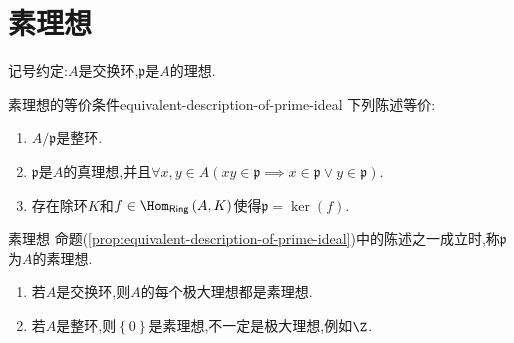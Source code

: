 \section{素理想}

记号约定:$A$是交换环,$\mathfrak{p}$是$A$的理想.

\begin{proposition}{素理想的等价条件}{equivalent-description-of-prime-ideal}
	下列陈述等价:
	\begin{enumerate}
		\item $A/\mathfrak{p}$是整环.
		\item $\mathfrak{p}$是$A$的真理想,并且$\forall x,y\in A\left(xy\in\mathfrak{p}\implies x\in\mathfrak{p}\vee y\in\mathfrak{p}\right)$.
		\item 存在除环$K$和$f\in\Hom_{\mathsf{Ring}}\left(A,K\right)$使得$\mathfrak{p}=\ker\left(f\right)$.
	\end{enumerate}
\end{proposition}

\begin{definition}{素理想}{}
	命题(\cref{prop:equivalent-description-of-prime-ideal})中的陈述之一成立时,称$\mathfrak{p}$为$A$的素理想.
\end{definition}

\begin{example}{}{}
	\begin{enumerate}
		\item 若$A$是交换环,则$A$的每个极大理想都是素理想.
		\item 若$A$是整环,则$\left\{0\right\}$是素理想,不一定是极大理想,例如$\Z$.
	\end{enumerate}
\end{example}




